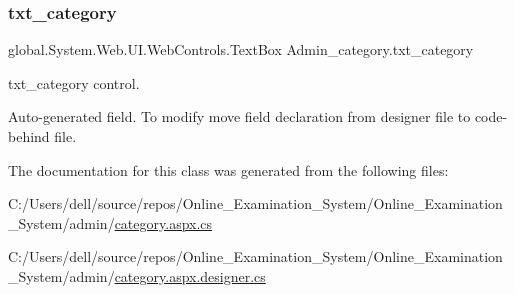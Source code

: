 \mbox{\label{class_admin__category_a616af427134e04a69b88ce443727449a}} 
\subsubsection{\texorpdfstring{txt\_category}{txt\_category}}
{\footnotesize\ttfamily global.\+System.\+Web.\+U\+I.\+Web\+Controls.\+Text\+Box Admin\+\_\+category.\+txt\+\_\+category\hspace{0.3cm}{\ttfamily [protected]}}



txt\+\_\+category control. 

Auto-\/generated field. To modify move field declaration from designer file to code-\/behind file. 

The documentation for this class was generated from the following files\+:\begin{DoxyCompactItemize}
\item 
C\+:/\+Users/dell/source/repos/\+Online\+\_\+\+Examination\+\_\+\+System/\+Online\+\_\+\+Examination\+\_\+\+System/admin/\mbox{\hyperlink{category_8aspx_8cs}{category.\+aspx.\+cs}}\item 
C\+:/\+Users/dell/source/repos/\+Online\+\_\+\+Examination\+\_\+\+System/\+Online\+\_\+\+Examination\+\_\+\+System/admin/\mbox{\hyperlink{category_8aspx_8designer_8cs}{category.\+aspx.\+designer.\+cs}}\end{DoxyCompactItemize}
